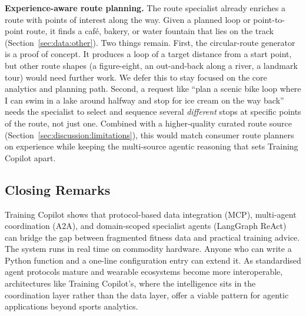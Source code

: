 \textbf{Experience-aware route planning.} The route specialist already enriches a route with points of interest along the way. Given a planned loop or point-to-point route, it finds a caf\'e, bakery, or water fountain that lies on the track (Section~\ref{sec:data:other}). Two things remain. First, the circular-route generator is a proof of concept. It produces a loop of a target distance from a start point, but other route shapes (a figure-eight, an out-and-back along a river, a landmark tour) would need further work. We defer this to stay focused on the core analytics and planning path. Second, a request like ``plan a scenic bike loop where I can swim in a lake around halfway and stop for ice cream on the way back'' needs the specialist to select and sequence several \textit{different} stops at specific points of the route, not just one. Combined with a higher-quality curated route source (Section~\ref{sec:discussion:limitations}), this would match consumer route planners on experience while keeping the multi-source agentic reasoning that sets Training Copilot apart.

\subsection{Closing Remarks}\label{sec:conclusion:closing}

Training Copilot shows that protocol-based data integration (MCP), multi-agent coordination (A2A), and domain-scoped specialist agents (LangGraph ReAct) can bridge the gap between fragmented fitness data and practical training advice. The system runs in real time on commodity hardware. Anyone who can write a Python function and a one-line configuration entry can extend it. As standardised agent protocols mature and wearable ecosystems become more interoperable, architectures like Training Copilot's, where the intelligence sits in the coordination layer rather than the data layer, offer a viable pattern for agentic applications beyond sports analytics.
